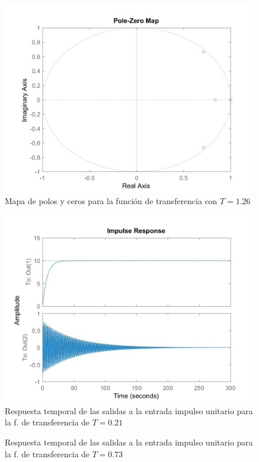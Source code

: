 \documentclass[journal]{IEEEtran}
\begin{document}
\begin{figure}[h!]
\caption{Mapa de polos y ceros para la función de transferencia con $T=1.26$\label{fig:pzGd2}}
  \centering
\includegraphics[scale=0.18]{tf/pzmap_Gd_2.jpg}
\end{figure}

\begin{figure}[h!]
\caption{Respuesta temporal de las salidas a la entrada impulso unitario para la f. de transferencia de $T=0.21$\label{fig:impulseGd}}
  \centering
\includegraphics[scale=0.18]{tf/impulse_Gd.jpg}
\end{figure}

\begin{figure}[h!]
\caption{Respuesta temporal de las salidas a la entrada impulso unitario para la f. de transferencia de $T=0.73$\label{fig:impulseGd1}}
  \centering
\end{figure}
\end{document}
